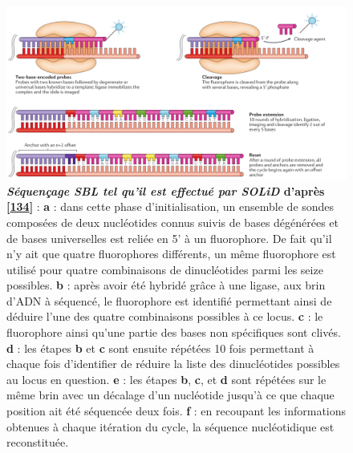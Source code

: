 \documentclass[12pt,a4paper,twoside]{ugathesis}
\theoremstyle{definition}
\theoremstyle{definition}
\theoremstyle{definition}
\theoremstyle{remark}
\begin{document}
\begin{figure}

{\centering \includegraphics[scale=.26]{figure/SBL_seq_solid} 

}

\caption[Séquençage SBL tel qu'il est effectué par SOLiD]{\textbf{\emph{Séquençage SBL tel qu'il est effectué par
SOLiD} d'après {[}\protect\hyperlink{ref-Goodwin2016}{134}{]}} :
\textbf{a} : dans cette phase d'initialisation, un ensemble de sondes
composées de deux nucléotides connus suivis de bases dégénérées et de
bases universelles est reliée en 5' à un fluorophore. De fait qu'il n'y
ait que quatre fluorophores différents, un même fluorophore est utilisé
pour quatre combinaisons de dinucléotides parmi les seize possibles.
\textbf{b} : après avoir été hybridé grâce à une ligase, aux brin d'ADN
à séquencé, le fluorophore est identifié permettant ainsi de déduire
l'une des quatre combinaisons possibles à ce locus. \textbf{c} : le
fluorophore ainsi qu'une partie des bases non spécifiques sont clivés.
\textbf{d} : les étapes \textbf{b} et \textbf{c} sont ensuite répétées
10 fois permettant à chaque fois d'identifier de réduire la liste des
dinucléotides possibles au locus en question. \textbf{e} : les étapes
\textbf{b}, \textbf{c}, et \textbf{d} sont répétées sur le même brin
avec un décalage d'un nucléotide jusqu'à ce que chaque position ait été
séquencée deux fois. \textbf{f} : en recoupant les informations obtenues
à chaque itération du cycle, la séquence nucléotidique est reconstituée.}\label{fig:pictsblSeq}
\end{figure}
\end{document}
